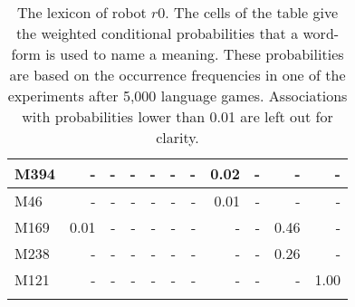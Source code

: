 \begin{table}[t]
{\begin{tabular}{ld{2}d{2}d{2}d{2}d{2}d{2}d{2}d{2}d{2}d{2}}
M394 & - & - & - & - & - & - & 0.02 & - & - & -\\\hline
M46 & - & - & - & - & - & - & 0.01 & - & - & -\\\hline
M169 & 0.01 & - & - & - & - & - & - & - & 0.46 & -\\\hline
M238 & - & - & - & - & - & - & - & - & 0.26 & -\\\hline
M121 & - & - & - & - & - & - & - & - & - & 1.00\\
\lspbottomrule
\end{tabular}}
\caption{The lexicon of robot $r0$. The cells of the table give the weighted conditional probabilities that a word-form is used to name a meaning. These probabilities are based on the occurrence frequencies in one of the experiments after 5,000 language games. Associations with probabilities lower than 0.01 are left out for clarity.}
\label{t:st:lexicon0}
\end{table}

